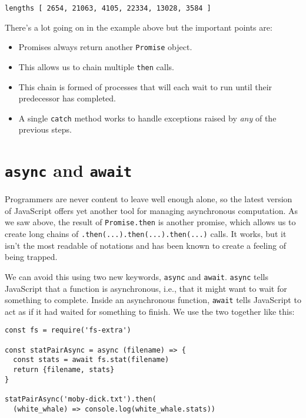 \begin{verbatim}
lengths [ 2654, 21063, 4105, 22334, 13028, 3584 ]
\end{verbatim}

There's a lot going on in the example above
but the important points are:

\begin{itemize}
\item
  Promises always return another \texttt{Promise} object.
\item
  This allows us to chain multiple \texttt{then} calls.
\item
  This chain is formed of processes that will each wait to run until their predecessor has completed.
\item
  A single \texttt{catch} method works to handle exceptions raised by \emph{any} of the previous steps.
\end{itemize}

\hypertarget{s:promises-async-await}{\section{\texorpdfstring{\texttt{async} and \texttt{await}}{async and await}}\label{s:promises-async-await}}

Programmers are never content to leave well enough alone,
so the latest version of JavaScript offers yet another tool for managing asynchronous computation.
As we saw above,
the result of \texttt{Promise.then} is another promise,
which allows us to create long chains of \texttt{.then(...).then(...).then(...)} calls.
It works,
but it isn't the most readable of notations and has been known to create a feeling of being trapped.

We can avoid this using two new keywords, \texttt{async} and \texttt{await}.
\texttt{async} tells JavaScript that a function is asynchronous,
i.e.,
that it might want to wait for something to complete.
Inside an asynchronous function,
\texttt{await} tells JavaScript to act as if it had waited for something to finish.
We use the two together like this:

\begin{verbatim}
const fs = require('fs-extra')

const statPairAsync = async (filename) => {
  const stats = await fs.stat(filename)
  return {filename, stats}
}

statPairAsync('moby-dick.txt').then(
  (white_whale) => console.log(white_whale.stats))
\end{verbatim}

